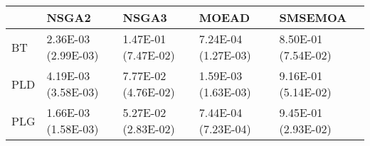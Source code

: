\begin{tabular}{lllll}
\toprule
{} &                NSGA2 &                NSGA3 &                MOEAD &              SMSEMOA \\
\midrule
BT  &  2.36E-03 (2.99E-03) &  1.47E-01 (7.47E-02) &  7.24E-04 (1.27E-03) &  8.50E-01 (7.54E-02) \\
PLD &  4.19E-03 (3.58E-03) &  7.77E-02 (4.76E-02) &  1.59E-03 (1.63E-03) &  9.16E-01 (5.14E-02) \\
PLG &  1.66E-03 (1.58E-03) &  5.27E-02 (2.83E-02) &  7.44E-04 (7.23E-04) &  9.45E-01 (2.93E-02) \\
\bottomrule
\end{tabular}
